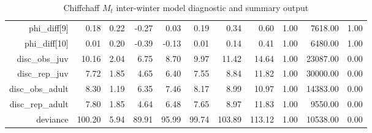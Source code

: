 \begin{table}[ht]
\begin{tabular}{rrrrrrrrrrr}
  phi\_diff[9] & 0.18 & 0.22 & -0.27 & 0.03 & 0.19 & 0.34 & 0.60 & 1.00 & 7618.00 & 1.00 \\ 
  phi\_diff[10] & 0.01 & 0.20 & -0.39 & -0.13 & 0.01 & 0.14 & 0.41 & 1.00 & 6480.00 & 1.00 \\ 
  disc\_obs\_juv & 10.16 & 2.04 & 6.75 & 8.70 & 9.97 & 11.42 & 14.64 & 1.00 & 23087.00 & 0.00 \\ 
  disc\_rep\_juv & 7.72 & 1.85 & 4.65 & 6.40 & 7.55 & 8.84 & 11.82 & 1.00 & 30000.00 & 0.00 \\ 
  disc\_obs\_adult & 8.30 & 1.19 & 6.35 & 7.46 & 8.17 & 8.99 & 10.97 & 1.00 & 14383.00 & 0.00 \\ 
  disc\_rep\_adult & 7.80 & 1.85 & 4.64 & 6.48 & 7.65 & 8.97 & 11.83 & 1.00 & 9550.00 & 0.00 \\ 
  deviance & 100.20 & 5.94 & 89.91 & 95.99 & 99.74 & 103.89 & 113.12 & 1.00 & 10538.00 & 0.00 \\ 
   \hline
\end{tabular}
\caption{Chiffchaff $M_t$ inter-winter model diagnostic and summary output} 
\label{tab:chiffchaff_mt_age_inter_summary_output}
\end{table}
